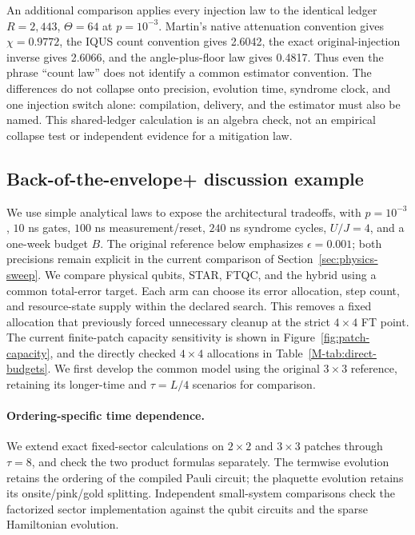 \documentclass[11pt]{article}
\newcommand{\eps}{\epsilon}
\begin{document}
An additional comparison applies every injection law to the identical
ledger $R=2{,}443$, $\Theta=64$ at $p=10^{-3}$. Martin's native
attenuation convention gives $\chi=0.9772$, the IQUS count convention
gives 2.6042, the exact original-injection inverse gives 2.6066, and
the angle-plus-floor law gives 0.4817. Thus even the phrase ``count law''
does not identify a common estimator convention. The differences do not
collapse onto precision, evolution time, syndrome clock, and one injection
switch alone: compilation, delivery, and the estimator must also be named.
This shared-ledger calculation is an algebra check, not an empirical
collapse test or independent evidence for a mitigation law.

\subsection{Back-of-the-envelope+ discussion example}\label{sec:discussion}
We use simple analytical laws to expose the architectural tradeoffs, with
$p=10^{-3}$, $10$ ns gates, $100$ ns measurement/reset, $240$ ns syndrome
cycles, $U/J=4$, and a one-week budget $B$. The original reference below
emphasizes $\eps=0.001$; both precisions remain explicit in the current
comparison of Section~\ref{sec:physics-sweep}. We compare physical qubits, STAR, FTQC,
and the hybrid using a common total-error target. Each arm can choose its
error allocation, step count, and resource-state supply within the declared
search. This removes a fixed allocation that previously forced unnecessary
cleanup at the strict $4\times4$ FT point.
The current finite-patch capacity sensitivity is shown in
Figure~\ref{fig:patch-capacity}, and the directly checked $4\times4$
allocations in Table~\ref{M-tab:direct-budgets}. We first develop the common
model using the original $3\times3$ reference, retaining its longer-time
and $\tau=L/4$ scenarios for comparison.

\paragraph{Ordering-specific time dependence.}
We extend exact fixed-sector calculations on $2\times2$ and $3\times3$
patches through $\tau=8$, and check the two product formulas separately.
The termwise evolution retains the ordering of the compiled Pauli circuit;
the plaquette evolution retains its onsite/pink/gold splitting. Independent
small-system comparisons check the factorized sector implementation against
the qubit circuits and the sparse Hamiltonian evolution.
\end{document}
